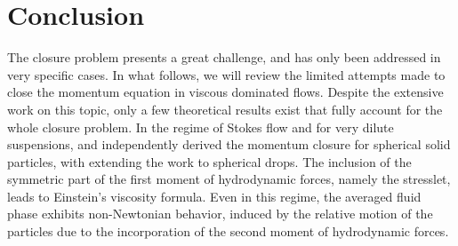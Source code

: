 \section{Conclusion}
\label{sec:conclusion}

The closure problem presents a great challenge, and has only been addressed in very specific cases. 
In what follows, we will review the limited attempts made to close the momentum equation in viscous dominated flows. 
Despite the extensive work on this topic, only a few theoretical results exist that fully account for the whole closure problem. 
In the regime of Stokes flow and for very dilute suspensions, \citet{jackson1997locally} and \citet{zhang1997momentum} independently derived the momentum closure for spherical solid particles, with \citet{zhang1997momentum}  extending the work to spherical drops. 
The inclusion of the symmetric part of the first moment of hydrodynamic forces, namely the stresslet, leads to Einstein's viscosity formula. 
Even in this regime, the averaged fluid phase exhibits non-Newtonian behavior, induced by the relative motion of the particles due to the incorporation of the second moment of hydrodynamic forces. %



